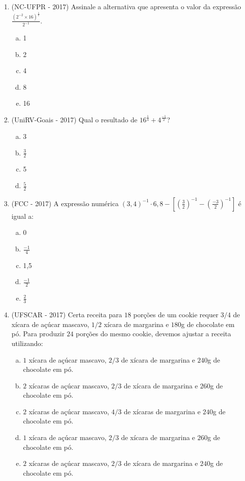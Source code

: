 \begin{enumerate}
  \item (NC-UFPR - 2017) Assinale a alternativa que apresenta o valor da expressão $\frac{(2^{-2} \times 16)^{\frac{1}{2}}}{2^{-1}}$.
   \begin{enumerate}[a)]
  \item 1
  \item 2
  \item 4
  \item 8
  \item 16
  \end{enumerate}
  
  \item (UniRV-Goais - 2017) Qual o resultado de $16^{\frac{1}{4}} + 4^{\frac{-1}{2}}$?
  \begin{enumerate}[a)]
  \item 3
  \item $\frac{3}{2}$
  \item 5
  \item $\frac{5}{2}$
  \end{enumerate}
  
  \item (FCC - 2017) A expressão numérica $(3,4)^{-1} \cdot 6,8 - \left[ \left(\frac{3}{2} \right)^{-1} - \left(\frac{-3}{2} \right)^{-1} \right]$ é igual a:
  \begin{enumerate}[a)]
  \item 0
  \item $\frac{-1}{4}$
  \item 1,5
  \item $\frac{-1}{2}$
  \item $\frac{2}{3}$
  \end{enumerate}
  
  \item (UFSCAR - 2017) Certa receita para $18$ porções de um cookie requer $3/4$ de xícara de açúcar mascavo, $1/2$ xícara de margarina e $180$g de chocolate em pó. Para produzir $24$ porções do mesmo cookie, devemos ajustar a receita utilizando:
   \begin{enumerate}[a)]
  \item $1$ xícara de açúcar mascavo, $2/3$ de xícara de margarina e $240$g de chocolate em pó.
  \item $2$ xícaras de açúcar mascavo, $2/3$ de xícara de margarina e $260$g de chocolate em pó.
  \item $2$ xícaras de açúcar mascavo, $4/3$ de xícaras de margarina e $240$g de chocolate em pó.
  \item $1$ xícara de açúcar mascavo, $2/3$ de xícara de margarina e $260$g de chocolate em pó.
  \item $2$ xícaras de açúcar mascavo, $2/3$ de xícara de margarina e $240$g de chocolate em pó. 
  \end{enumerate}


\end{enumerate}
